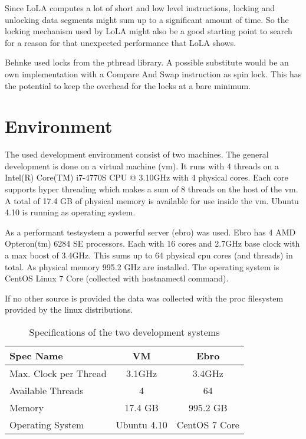 Since LoLA computes a lot of short and low level instructions, locking and unlocking data segments might sum up to a significant amount of time. So the locking mechanism used by LoLA might also be a good starting point to search for a reason for that unexpected performance that LoLA shows.

Behnke used locks from the pthread library\cite{?}. A possible substitute would be an own implementation with a Compare And Swap instruction as spin lock. This has the potential to keep the overhead for the locks at a bare minimum.

\section{Environment}
\label{env}
The used development environment consist of two machines. The general development is done on a virtual machine (vm). It runs with 4 threads on a Intel(R) Core(TM) i7-4770S CPU @ 3.10GHz with 4 physical cores. Each core supports hyper threading which makes a sum of 8 threads on the host of the vm. A total of 17.4 GB of physical memory is available for use inside the vm. Ubuntu 4.10 is running as operating system.

As a performant testsystem a powerful server (ebro) was used. Ebro has 4 AMD Opteron(tm) 6284 SE processors. Each with 16 cores and 2.7GHz base clock with a max boost of 3.4GHz\cite{AMDSpecs}. This sums up to 64 physical cpu cores (and threads) in total. As physical memory 995.2 GHz are installed. The operating system is CentOS Linux 7 Core (collected with hostnamectl command).

If no other source is provided the data was collected with the proc filesystem provided by the linux distributions.
\begin{center}
    \begin{table}[H]
        \centering
        \begin{tabular}{ | l | c | c |}
            \hline
            \textbf{Spec Name} & \textbf{VM} & \textbf{Ebro} \\ \hline
            Max. Clock per Thread & 3.1GHz & 3.4GHz \\ 
            Available Threads & 4 & 64 \\ 
            Memory & 17.4 GB & 995.2 GB\\ 
            Operating System & Ubuntu 4.10 & CentOS 7 Core \\ \hline
        \end{tabular}
        \caption{Specifications of the two development systems}
    \end{table}
\end{center}



